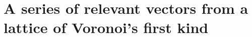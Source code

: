 \documentclass[final,leqno]{siamltex}
\begin{document}


\section{A series of relevant vectors from a lattice of Voronoi's first kind}\label{sec:seri-relev-vect}
\end{document}
